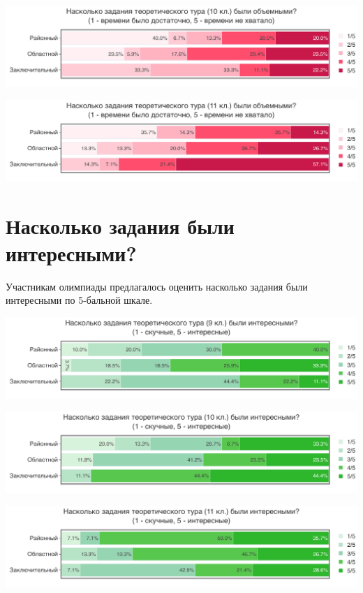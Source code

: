 \includegraphics[width=\linewidth]{../export/pdf/demographics/volume-grade10.pdf}

\includegraphics[width=\linewidth]{../export/pdf/demographics/volume-grade11.pdf}

\newpage 

\section{Насколько задания были интересными?}

Участникам олимпиады предлагалось оценить насколько задания были интересными по 5-бальной шкале.

\includegraphics[width=\linewidth]{../export/pdf/demographics/interest-grade9.pdf}

\includegraphics[width=\linewidth]{../export/pdf/demographics/interest-grade10.pdf}

\includegraphics[width=\linewidth]{../export/pdf/demographics/interest-grade11.pdf}


